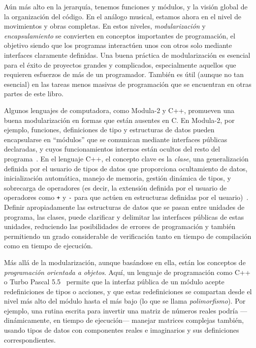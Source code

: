 \documentclass[10pt,a4paper]{book}
\begin{document}
\medskip

Aún más alto en la jerarquía, tenemos funciones y módulos, y la visión global de la organización del código. En el análogo musical, estamos ahora en el nivel de movimientos y obras completas. En estos niveles, \textit{modularización} y \textit{encapsulamiento} se convierten en conceptos importantes de programación, el objetivo siendo que los programas interactúen unos con otros solo mediante interfaces claramente definidas. Una buena práctica de modularización es esencial para el éxito de proyectos grandes y complicados, especialmente aquellos que requieren esfuerzos de más de un programador. También es útil (aunque no tan esencial) en las tareas menos masivas de programación que se encuentran en otras partes de este libro.

\medskip

Algunos lenguajes de computadora, como Modula-2 y C++, promueven una buena modularización en formas que están ausentes en C. En Modula-2, por ejemplo, funciones, definiciones de tipo y estructuras de datos pueden encapsularse en “módulos” que se comunican mediante interfaces públicas declaradas, y cuyos funcionamientos internos están ocultos del resto del programa~\cite{modula2}. En el lenguaje C++, el concepto clave es la \textit{clase}, una generalización definida por el usuario de tipos de datos que proporciona ocultamiento de datos, inicialización automática, manejo de memoria, gestión dinámica de tipos, y sobrecarga de operadores (es decir, la extensión definida por el usuario de operadores como \texttt{+} y \texttt{-} para que actúen en estructuras definidas por el usuario)~\cite{cppclasses}. Definir apropiadamente las estructuras de datos que se pasan entre unidades de programa, las clases, puede clarificar y delimitar las interfaces públicas de estas unidades, reduciendo las posibilidades de errores de programación y también permitiendo un grado considerable de verificación tanto en tiempo de compilación como en tiempo de ejecución.

\medskip

Más allá de la modularización, aunque basándose en ella, están los conceptos de \textit{programación orientada a objetos}. Aquí, un lenguaje de programación como C++ o Turbo Pascal 5.5~\cite{oop} permite que la interfaz pública de un módulo acepte redefiniciones de tipos o acciones, y que estas redefiniciones se compartan desde el nivel más alto del módulo hasta el más bajo (lo que se llama \textit{polimorfismo}). Por ejemplo, una rutina escrita para invertir una matriz de números reales podría —dinámicamente, en tiempo de ejecución— manejar matrices complejas también, usando tipos de datos con componentes reales e imaginarios y sus definiciones correspondientes.
\end{document}
